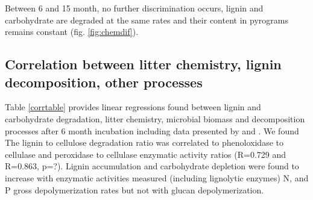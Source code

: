 \documentclass[authoryear,preprint,review,12pt]{elsarticle}
\begin{document}
Between 6 and 15 month, no further discrimination occurs, lignin and carbohydrate are degraded at the same rates and their content in pyrograms remains constant (fig. \ref{fig:chemdif}).



\subsection{Correlation between litter chemistry, lignin decomposition, other processes}

Table \ref{corrtable} provides linear regressions found between lignin and carbohydrate degradation, litter chemistry, microbial biomass and decomposition processes after 6 month incubation including data presented by \cite{Mooshammer2011} and \cite{Leitner2011}. We found  The lignin to cellulose degradation ratio was correlated to phenoloxidase to cellulase and peroxidase to cellulase enzymatic activity ratios (R=0.729 and R=0.863, p=?). Lignin accumulation and carbohydrate depletion were found to increase with enzymatic activities measured (including lignolytic enzymes) N, and P gross depolymerization rates but not with glucan depolymerization.
\end{document}
